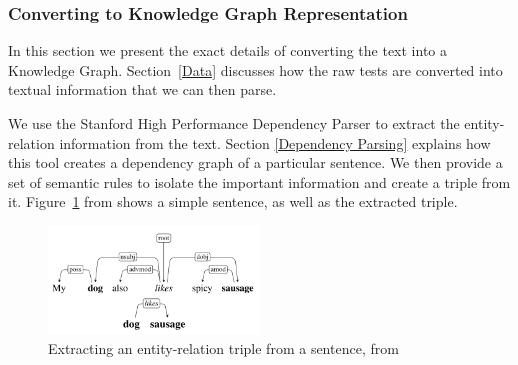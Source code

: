 \documentclass[pageno]{final_paper}
\begin{document}
\subsubsection{Converting to Knowledge Graph Representation}
\label{Converting to Knowledge Graph Representation}

In this section we present the exact details of converting the text into a
Knowledge Graph. Section~\ref{Data} discusses how the raw tests are converted
into textual information that we can then parse.

We use the Stanford High Performance Dependency Parser \cite{Chen2014} to
extract the entity-relation information from the text. Section \ref{Dependency
Parsing} explains how this tool creates a dependency graph of a particular
sentence. We then provide a set of semantic rules to isolate the important
information and create a triple from it. Figure~\ref{fig: dependency extraction}
from \cite{Narasimhan2015} shows a simple sentence, as well as the extracted
triple.

\begin{figure}[!tb]
    \centering
    \includegraphics[width=0.5\textwidth,keepaspectratio]{figures/Dependency_Extraction.png}
    \caption{Extracting an entity-relation triple from a sentence, from \cite{Narasimhan2015}}
    \label{fig: dependency extraction}
\end{figure}
\end{document}
